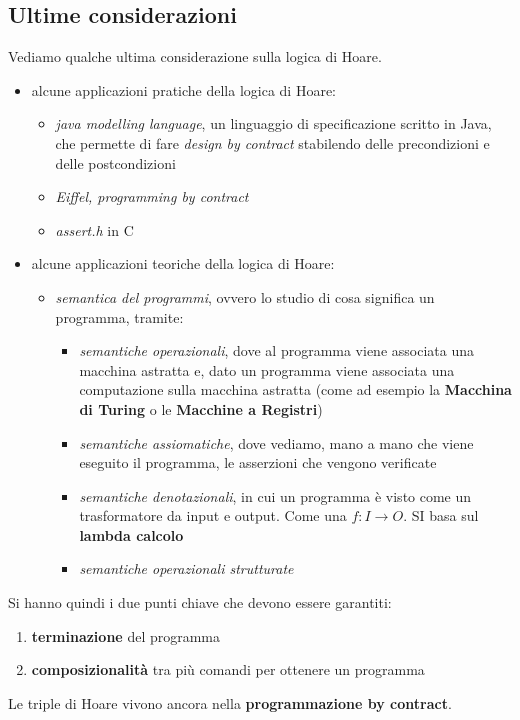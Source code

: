 \documentclass[a4paper,12pt, oneside]{book}
\begin{document}
\subsection{Ultime considerazioni}
Vediamo qualche ultima considerazione sulla logica di Hoare.
\begin{itemize}
  \item alcune applicazioni pratiche della logica di Hoare:
  \begin{itemize}
    \item \textit{java modelling language}, un linguaggio di specificazione
    scritto in Java, che permette di fare \textit{design by contract} stabilendo
    delle precondizioni e delle postcondizioni 
    \item \textit{Eiffel, programming by contract}
    \item \textit{assert.h} in C
  \end{itemize}
  
  \item alcune applicazioni teoriche della logica di Hoare:
  \begin{itemize}
    \item \textit{semantica del programmi}, ovvero lo studio di cosa significa
    un programma, tramite:
    \begin{itemize}
      \item \textit{semantiche operazionali}, dove al programma
      viene associata una macchina astratta e, dato un programma viene associata
      una computazione sulla macchina astratta (come ad esempio la
      \textbf{Macchina di Turing} o le \textbf{Macchine a Registri})
      \item \textit{semantiche assiomatiche}, dove vediamo, mano a mano che
      viene eseguito il programma, le asserzioni che vengono verificate
      \item \textit{semantiche denotazionali}, in cui un programma è visto come
      un trasformatore da input e output. Come una $f:I\to O$. SI basa sul
      \textbf{lambda calcolo}
      \item \textit{semantiche operazionali strutturate}
    \end{itemize}
  \end{itemize}
\end{itemize}
Si hanno quindi i due punti chiave che devono essere garantiti:
\begin{enumerate}
  \item \textbf{terminazione} del programma
  \item \textbf{composizionalità} tra più comandi per ottenere un programma
\end{enumerate}
Le triple di Hoare vivono ancora nella \textbf{programmazione by contract}.
\end{document}
